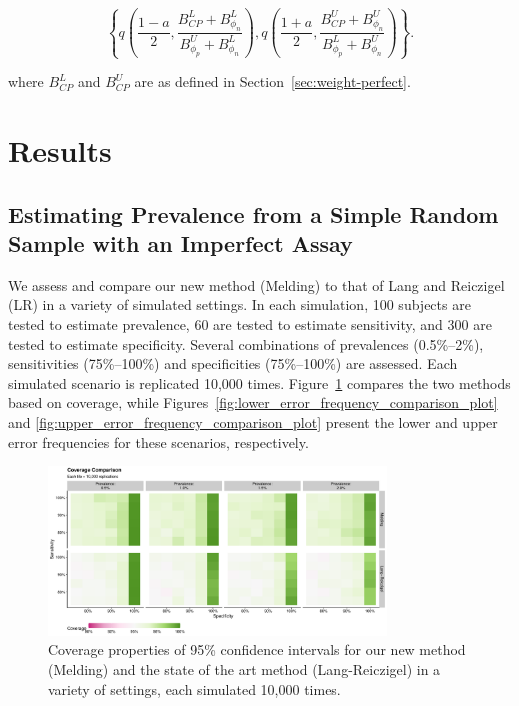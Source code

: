 \documentclass[AMA,STIX1COL]{WileyNJD-v2}
\begin{document}
\begin{equation}
    \left\{ q \left( \frac{1 - a}{2}, \frac{B_{CP}^L + B_{\phi_n}^L }{B_{\phi_p}^U + B_{\phi_n}^L }  \right),  q \left( \frac{1 + a}{2}, \frac{B_{CP}^U + B_{\phi_n}^U}{B_{\phi_p}^L + B_{\phi_n}^U}  \right) \right\}.
\end{equation}

where \( B_{CP}^L \) and \( B_{CP}^U \) are as defined in Section~\ref{sec:weight-perfect}.

\section{Results}

\subsection{Estimating Prevalence from a Simple Random Sample with an Imperfect Assay}

We assess and compare our new method (Melding) to that of Lang and Reiczigel (LR) in a variety of simulated settings.
In each simulation, 100 subjects are tested to estimate prevalence, 60 are tested to estimate sensitivity, and 300 are tested to estimate specificity.
Several combinations of prevalences (0.5\%--2\%), sensitivities (75\%--100\%) and specificities (75\%--100\%) are assessed.
Each simulated scenario is replicated 10,000 times.
Figure~\ref{fig:coverage_comparison_plot} compares the two methods based on coverage, while Figures~\ref{fig:lower_error_frequency_comparison_plot} and \ref{fig:upper_error_frequency_comparison_plot} present the lower and upper error frequencies for these scenarios, respectively.

\begin{figure}
    \centering
    \includegraphics[width=0.8\textwidth]{figures/simple_coverage_comparison_plot.pdf}
    \caption{Coverage properties of 95\% confidence intervals for our new method (Melding) and the state of the art method (Lang-Reiczigel) in a variety of settings, each simulated 10,000 times.}
    \label{fig:coverage_comparison_plot}
\end{figure}
\end{document}

